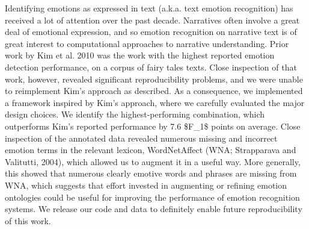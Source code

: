 Identifying emotions as expressed in text (a.k.a. text emotion recognition) has received a lot of attention over the past decade. Narratives often involve a great deal of emotional expression, and so emotion recognition on narrative text is of great interest to computational approaches to narrative understanding. Prior work by Kim et al. 2010 was the work with the highest reported emotion detection performance, on a corpus of fairy tales texts. Close inspection of that work, however, revealed significant reproducibility problems, and we were unable to reimplement Kim's approach as described. As a consequence, we implemented a framework inspired by Kim's approach, where we carefully evaluated the major design choices. We identify the highest-performing combination, which outperforms Kim's reported performance by 7.6 \$F\_1\$ points on average. Close inspection of the annotated data revealed numerous missing and incorrect emotion terms in the relevant lexicon, WordNetAffect  (WNA;  Strapparava and  Valitutti, 2004), which allowed us to augment it in a useful way. More generally, this showed that numerous clearly emotive words and phrases are missing from WNA, which suggests that effort invested in augmenting or refining emotion ontologies could be useful for improving the performance of emotion recognition systems. We release our code and data to definitely enable future reproducibility of this work.
